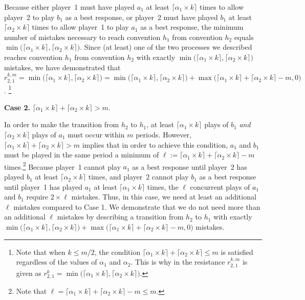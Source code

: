 Because either player~1 must have played $a_1$ at least $\lceil \alpha_1 \times k \rceil$ times to allow player~2 to play $b_1$ as a best response, or player~2 must have played $b_1$ at least $\lceil \alpha_2 \times k \rceil$ times to allow player~1 to play $a_1$ as a best response, the minimum number of mistakes necessary to reach convention $h_1$ from convention $h_2$ equals $\min\big(\lceil \alpha_1 \times k \rceil,\lceil \alpha_2 \times k \rceil\big)$. Since (at least) one of the two processes we described reaches convention $h_1$ from convention $h_2$ with exactly $\min\big(\lceil \alpha_1 \times k \rceil,\lceil \alpha_2 \times k \rceil\big)$ mistakes, we have demonstrated that 
$r_{2,1}^{k,m} =  \min\big(\lceil \alpha_1 \times k \rceil,\lceil \alpha_2 \times k \rceil\big) = \min\big(\lceil \alpha_1 \times k \rceil,\lceil \alpha_2 \times k \rceil\big)+\max\big(\lceil\alpha_1\times k\rceil+\lceil \alpha_2 \times k \rceil-m,0\big)$.%
\footnote{Note that when $k \leq m/2$, the condition $\lceil \alpha_1 \times k \rceil + \lceil \alpha_2 \times k \rceil \leq m$ is satisfied regardless of the values of $\alpha_1$ and $\alpha_2$. This  is why in \cite{Young1998} the resistance $r_{2,1}^{k,m}$ is given as $r_{2,1}^{k} = \min\big(\lceil \alpha_1 \times k \rceil, \lceil \alpha_2 \times k \rceil\big)$.%
} 


{\bf Case 2.} $\lceil \alpha_1 \times k \rceil + \lceil \alpha_2 \times k \rceil > m$. 

In order to make the transition from $h_2$ to $h_1$, at least $\lceil \alpha_1 \times k \rceil$ plays of $b_1$ \emph{and} $\lceil \alpha_2 \times k \rceil$ plays of $a_1$ must occur within $m$ periods.
However, $\lceil \alpha_1 \times k \rceil + \lceil \alpha_2 \times k \rceil > m$ implies that in order to achieve this condition, $a_1$ and $b_1$ must be played in the same period a minimum of $\ell:= \lceil \alpha_1 \times k \rceil+\lceil \alpha_2 \times k \rceil-m$ times.\footnote{Note that $\ell= \lceil \alpha_1 \times k \rceil+\lceil \alpha_2 \times k \rceil-m\leq m$.}
%
Because player~1 cannot play $a_1$ as a best response until player~2 has played $b_1$ at least $\lceil \alpha_2 \times k \rceil$ times, and player~2 cannot play $b_1$ as a best response until player~1 has played $a_1$ at least $\lceil \alpha_1 \times k \rceil$ times, the $\ell$ concurrent plays of $a_1$ and $b_1$ require $2\times \ell$ mistakes. Thus, in this case, we need at least an additional $\ell$ mistakes compared to Case 1. We demonstrate that we do not need more than an additional $\ell$ mistakes by describing a transition from $h_2$ to $h_1$ with exactly $\min\big(\lceil \alpha_1 \times k \rceil,\lceil \alpha_2 \times k \rceil\big) + \max\big(\lceil\alpha_1\times k\rceil+\lceil \alpha_2 \times k \rceil-m,0\big)$ mistakes. 


